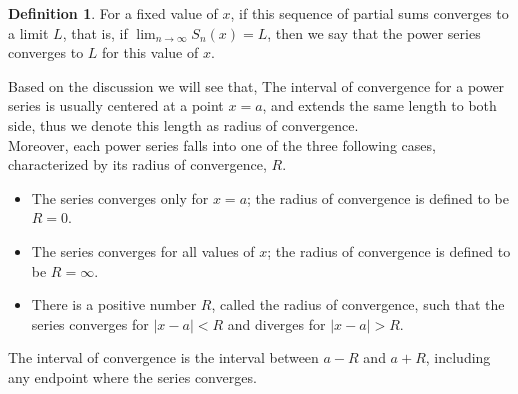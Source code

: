 \documentclass[12pt]{article}
\theoremstyle{definition}
\theoremstyle{definition}
\newtheorem{definition}{Definition}[section]
\theoremstyle{remark}
\theoremstyle{definition}
\theoremstyle{definition}
\theoremstyle{definition}
\begin{document}
\begin{definition}
For a fixed value of $x$, if this sequence of partial sums converges to a limit $L$, that is, if
$\lim_{n \to \infty}S_n(x) = L$, then we say that the power series converges to $L$ for this value of $x$.
\end{definition}

Based on the discussion we will see that, The interval of convergence for a power series is usually centered at a point $x=a$, and extends the same length to both side, thus we denote this length as radius of convergence.\\

Moreover, each power series falls into one of the three following cases, characterized by its radius of convergence, $R$.
\begin{itemize}
\item The series converges only for $x = a$; the radius of convergence is defined to be $R = 0$.
\item The series converges for all values of $x$; the radius of convergence is defined to be
$R = \infty$.
\item There is a positive number $R$, called the radius of convergence, such that the series
converges for $|x - a| < R$ and diverges for $|x - a| > R$. 
\end{itemize}
The interval of convergence is the interval between $a - R$ and $a + R$, including any
endpoint where the series converges.
\end{document}
